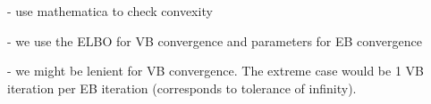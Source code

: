 \documentclass[a4paper,hidelinks]{article}\usepackage[]{graphicx}\usepackage[]{color}
\newcommand{\I}{\mathbf{I}}
\newcommand{\0}{\bm{0}}
\newcommand{\argmax}{\text{argmax} \,}
\newcommand{\E}{\mathbb{E}}
\newcommand{\trace}{\text{tr}}
\renewcommand{\(}{\left(}
\renewcommand{\)}{\right)}
\renewcommand{\[}{\left[}
\renewcommand{\]}{\right]}
\begin{document}
	- use mathematica to check convexity
	
	- we use the ELBO for VB convergence and parameters for EB convergence
	
	- we might be lenient for VB convergence. The extreme case would be 1 VB iteration per EB iteration (corresponds to tolerance of infinity).


	
\end{document}
